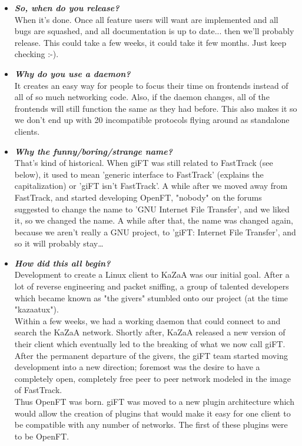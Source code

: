 \documentclass[10pt]{article}
\newcommand{\question}[1]{\item\textbf{\emph{#1}}}
\begin{document}
\begin{itemize}
\question {So, when do you release?}\\
When it's done. Once all feature users will want are implemented
and all bugs are squashed, and all documentation is up to date...
then we'll probably release. This could take a few weeks, it could
take it few months. Just keep checking :-).

\question {Why do you use a daemon?}\\
It creates an easy way for people to focus their time on frontends
instead of all of so much networking code. Also, if the daemon
changes, all of the frontends will still function the same as they
had before. This also makes it so we don't end up with 20
incompatible protocols flying around as standalone clients.

\question {Why the funny/boring/strange name?}\\
That's kind of historical. When giFT was still related to
FastTrack (see below), it used to mean 'generic interface to
FastTrack' (explains the capitalization) or 'giFT isn't
FastTrack'. A while after we moved away from FastTrack, and
started developing OpenFT, "nobody" on the forums suggested to
change the name to 'GNU Internet File Transfer', and we liked it,
so we changed the name.  A while after that, the name was changed
again, because we aren't really a GNU project, to 'giFT: Internet
File Transfer', and so it will probably stay\ldots

\question {How did this all begin?}\\
Development to create a Linux client to KaZaA was our initial
goal. After a lot of reverse engineering and packet sniffing, a
group of talented developers which became known as "the givers"
stumbled onto our project (at the time "kazaatux"). \\
Within a few weeks, we had a working daemon that could connect to
and search the KaZaA network. Shortly after, KaZaA released a new
version of their client which eventually led to the breaking of
what we now call giFT. \\
After the permanent departure of the givers, the giFT team started
moving development into a new direction; foremost was the desire
to have a completely open, completely free peer to peer network
modeled in the image of FastTrack. \\
Thus OpenFT was born. giFT was moved to a new plugin architecture
which would allow the creation of plugins that would make it easy
for one client to be compatible with any number of networks. The
first of these plugins were to be OpenFT.

\end{itemize}
\end{document}
